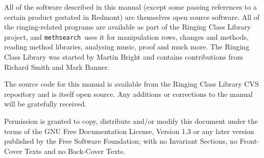 \documentclass[a4paper,11pt,oneside]{book}
\def\methsearch{\texttt{meth\-search}}
\begin{document}
All of the software described in this manual (except some passing
references to a certain product gestated in Redmont) are themselves open
source software.  All of the ringing-related programs are available as 
part of the Ringing Class Library project,
and \methsearch\ uses it for manipulation rows, changes and methods, 
reading method libraries, analysing music, proof and much more.  
The Ringing Class Library was started by Martin Bright 
and contains contributions from Richard Smith and Mark Banner.

The source code for this manual is available from the Ringing Class Library
CVS repository and is itself open source.  Any additions or corrections 
to the manual will be gratefully received.

\vfil
\footnotesize
Permission is granted to copy, distribute and/or modify this
document under the terms of the GNU Free Documentation License,
Version 1.3 or any later version published by the Free Software
Foundation; with no Invariant Sections, no Front-Cover Texts and
no Back-Cover Texts.
\end{document}
